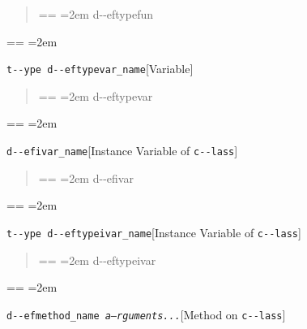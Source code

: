\documentclass{book}
\makeatletter
\newenvironment{GNUTexinfopreformatted}{%
  \par\obeylines\obeyspaces\frenchspacing
  \parskip=\z@\parindent=\z@}{}
\makeatother
\begin{document}
%
\begin{quote}
\unskip{\parskip=0pt\noindent}%
\begin{GNUTexinfopreformatted}
\leftskip=2em\relax\ttfamily%
d{-}{-}eftypefun
\end{GNUTexinfopreformatted}
\end{quote}
\begin{GNUTexinfopreformatted}
\leftskip=2em\relax\ttfamily%

\end{GNUTexinfopreformatted}
\noindent\texttt{t{-}{-}ype d{-}{-}eftypevar\_name}\hfill[Variable]



%
\begin{quote}
\unskip{\parskip=0pt\noindent}%
\begin{GNUTexinfopreformatted}
\leftskip=2em\relax\ttfamily%
d{-}{-}eftypevar
\end{GNUTexinfopreformatted}
\end{quote}
\begin{GNUTexinfopreformatted}
\leftskip=2em\relax\ttfamily%

\end{GNUTexinfopreformatted}
\noindent\texttt{d{-}{-}efivar\_name}\hfill[Instance Variable of \texttt{c{-}{-}lass}]



%
\begin{quote}
\unskip{\parskip=0pt\noindent}%
\begin{GNUTexinfopreformatted}
\leftskip=2em\relax\ttfamily%
d{-}{-}efivar
\end{GNUTexinfopreformatted}
\end{quote}
\begin{GNUTexinfopreformatted}
\leftskip=2em\relax\ttfamily%

\end{GNUTexinfopreformatted}
\noindent\texttt{t{-}{-}ype d{-}{-}eftypeivar\_name}\hfill[Instance Variable of \texttt{c{-}{-}lass}]



%
\begin{quote}
\unskip{\parskip=0pt\noindent}%
\begin{GNUTexinfopreformatted}
\leftskip=2em\relax\ttfamily%
d{-}{-}eftypeivar
\end{GNUTexinfopreformatted}
\end{quote}
\begin{GNUTexinfopreformatted}
\leftskip=2em\relax\ttfamily%

\end{GNUTexinfopreformatted}
\noindent\texttt{d{-}{-}efmethod\_name \EmbracOn{}\textnormal{\textsl{a--rguments...}}\EmbracOff{}}\hfill[Method on \texttt{c{-}{-}lass}]
\end{document}
